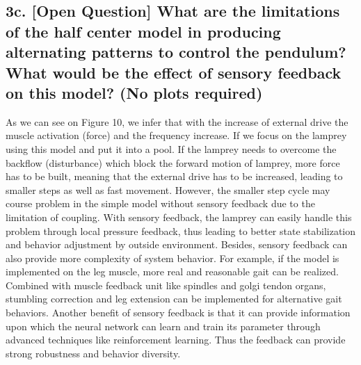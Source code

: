 \documentclass{cmc}
\begin{document}
\subsection*{3c. [Open Question] What are the limitations of the half
  center model in producing alternating patterns to control the
  pendulum? What would be the effect of sensory feedback on this
  model? (No plots required)}
\label{sec:4d}

As we can see on Figure 10, we infer that with the increase of external drive the muscle activation (force) and the frequency increase. If we focus on the lamprey using this model and put it into a pool. If the lamprey needs to overcome the backflow (disturbance) which block the forward motion of lamprey, more force has to be built, meaning that the external drive has to be increased, leading to smaller steps as well as fast movement. However, the smaller step cycle may course problem in the simple model without sensory feedback due to the limitation of coupling.
With sensory feedback, the lamprey can easily handle this problem through local pressure feedback, thus leading to better state stabilization and behavior adjustment by outside environment. 
Besides, sensory feedback can also provide more complexity of system behavior. For example, if the model is implemented on the leg muscle, more real and reasonable gait can be realized. Combined with muscle feedback unit like spindles and golgi tendon organs, stumbling correction and leg extension can be implemented for alternative gait behaviors.
Another benefit of sensory feedback is that it can provide information upon which the neural network can learn and train its parameter through advanced techniques like reinforcement learning.
Thus the feedback can provide strong robustness and behavior diversity.



\newpage
\end{document}
